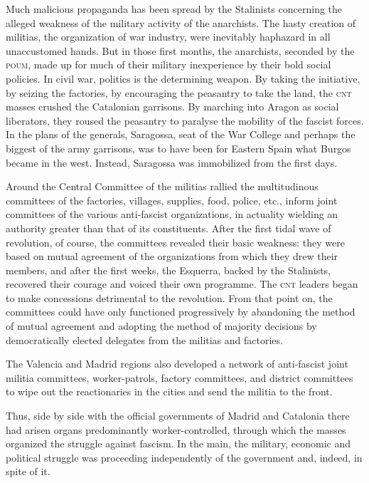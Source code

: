 Much malicious propaganda has been spread by the Stalinists concerning the alleged weakness of the military activity of the anarchists. The hasty creation of militias, the organization of war industry, were inevitably haphazard in all unaccustomed hands. But in those first months, the anarchists, seconded by the \textsc{poum}, made up for much of their military inexperience by their bold social policies. In civil war, politics is the determining weapon. By taking the initiative, by seizing the factories, by encouraging the peasantry to take the land, the \textsc{cnt} masses crushed the Catalonian garrisons. By marching into Aragon as social liberators, they roused the peasantry to paralyse the mobility of the fascist forces. In the plans of the generals, Saragossa, seat of the War College and perhaps the biggest of the army garrisons, was to have been for Eastern Spain what Burgos became in the west. Instead, Saragossa was immobilized from the first days.

Around the Central Committee of the militias rallied the multitudinous committees of the factories, villages, supplies, food, police, etc., inform joint committees of the various anti-fascist organizations, in actuality wielding an authority greater than that of its constituents. After the first tidal wave of revolution, of course, the committees revealed their basic weakness: they were based on mutual agreement of the organizations from which they drew their members, and after the first weeks, the Esquerra, backed by the Stalinists, recovered their courage and voiced their own programme. The \textsc{cnt} leaders began to make concessions detrimental to the revolution. From that point on, the committees could have only functioned progressively by abandoning the method of mutual agreement and adopting the method of majority decisions by democratically elected delegates from the militias and factories.

The Valencia and Madrid regions also developed a network of anti-fascist joint militia committees, worker-patrols, factory committees, and district committees to wipe out the reactionaries in the cities and send the militia to the front.
\nowidow

Thus, side by side with the official governments of Madrid and Catalonia there had arisen organs predominantly worker-controlled, through which the masses organized the struggle against fascism. In the main, the military, economic and political struggle was proceeding independently of the government and, indeed, in spite of it.

